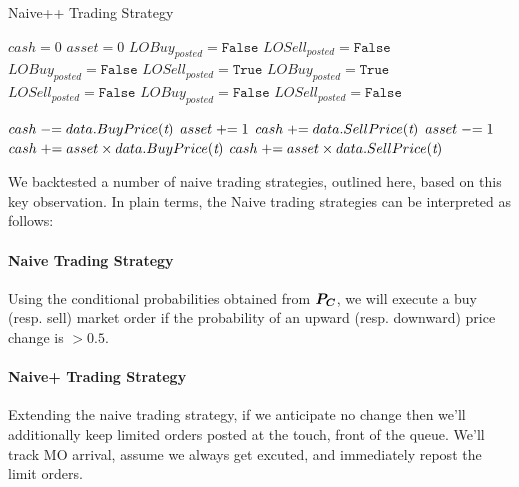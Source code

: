 \begin{algorithm}
\caption{Naive++ Trading Strategy}
\begin{algorithmic}[1]
\State $cash = 0$
\State $asset = 0$
\State $LOBuy_{posted} = \texttt{False}$
\State $LOSell_{posted} = \texttt{False}$
		\State $LOBuy_{posted} = \texttt{False}$
		\State $LOSell_{posted} = \texttt{True}$
		\State $LOBuy_{posted} = \texttt{True}$
		\State $LOSell_{posted} = \texttt{False}$
		\State $LOBuy_{posted} = \texttt{False}$
		\State $LOSell_{posted} = \texttt{False}$
	\EndIf

			\State $cash \mathrel{-}= data.BuyPrice(\textit{t})$	
			\State $asset \mathrel{+}= 1$
			\State $cash \mathrel{+}= data.SellPrice(\textit{t})$
			\State $asset \mathrel{-}= 1$
		\EndIf
	\EndFor
\EndFor
{} 
\State $cash \mathrel{+}= asset \times data.BuyPrice(\textit{t})$
\State $cash \mathrel{+}= asset \times data.SellPrice(\textit{t})$	
\EndIf
\end{algorithmic}
\end{algorithm}

We backtested a number of naive trading strategies, outlined here, based on this key observation. In plain terms, the Naive trading strategies can be interpreted as follows:

\paragraph{Naive Trading Strategy}  Using the conditional probabilities obtained from $\boldsymbol{P_C}$, we will execute a buy (resp. sell) market order if the probability of an upward (resp. downward) price change is $> 0.5$.

\paragraph{Naive+ Trading Strategy} Extending the naive trading strategy, if we anticipate no change then we'll additionally keep limited orders posted at the touch, front of the queue. We'll track MO arrival, assume we always get excuted, and immediately repost the limit orders.

